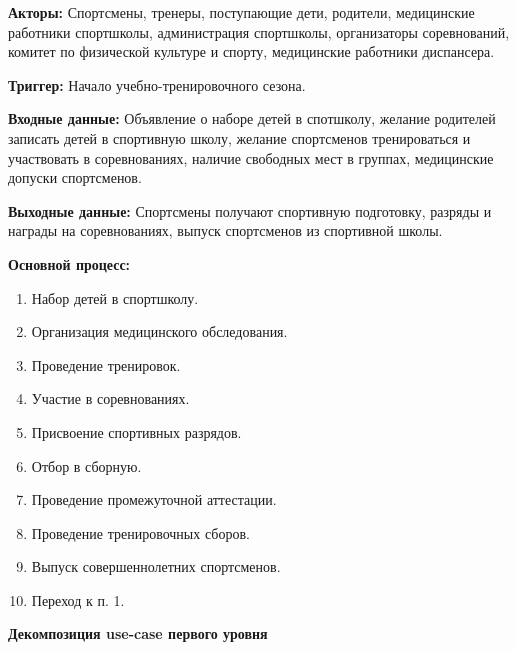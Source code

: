 \documentclass[12pt,a4paper,final]{article} %
\begin{document}
\par \textbf{Акторы:} Спортсмены, тренеры, поступающие дети, родители, медицинские работники спортшколы, администрация спортшколы, организаторы соревнований, комитет по физической культуре и спорту, медицинские работники диспансера.

\par \textbf{Триггер:} Начало учебно-тренировочного сезона.

\par \textbf{Входные данные:} Объявление о наборе детей в спотшколу, желание родителей записать детей в спортивную школу, желание спортсменов тренироваться и участвовать в соревнованиях, наличие свободных мест в группах, медицинские допуски спортсменов.

\par \textbf{Выходные данные:} Спортсмены получают спортивную подготовку, разряды и награды на соревнованиях, выпуск спортсменов из спортивной школы.

\par \textbf{Основной процесс:}
\begin{enumerate}[nosep, label=1.\arabic*]   
	\item Набор детей в спортшколу.
	\item Организация медицинского обследования.
	\item Проведение тренировок.
	\item Участие в соревнованиях.
	\item Присвоение спортивных разрядов.
	\item Отбор в сборную.
	\item Проведение промежуточной аттестации.
	\item Проведение тренировочных сборов.
	\item Выпуск совершеннолетних спортсменов.
	\item Переход к п. 1.
\end{enumerate}

\vspace{12pt}
\par \textbf{Декомпозиция use-case первого уровня}
\end{document}
